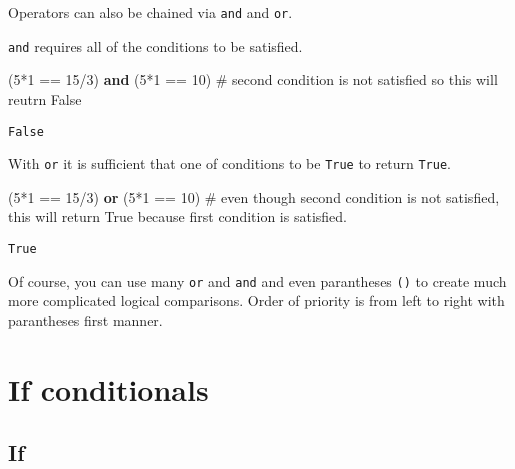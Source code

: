 \documentclass[
  letterpaper,
  DIV=11,
  numbers=noendperiod]{scrreprt}
\newenvironment{Shaded}{\begin{snugshade}}{\end{snugshade}}
\newcommand{\CommentTok}[1]{\textcolor[rgb]{0.37,0.37,0.37}{#1}}
\newcommand{\DecValTok}[1]{\textcolor[rgb]{0.68,0.00,0.00}{#1}}
\newcommand{\KeywordTok}[1]{\textcolor[rgb]{0.00,0.23,0.31}{\textbf{#1}}}
\newcommand{\NormalTok}[1]{\textcolor[rgb]{0.00,0.23,0.31}{#1}}
\newcommand{\OperatorTok}[1]{\textcolor[rgb]{0.37,0.37,0.37}{#1}}
\begin{document}
Operators can also be chained via \texttt{and} and \texttt{or}.

\texttt{and} requires all of the conditions to be satisfied.

\begin{Shaded}
\begin{Highlighting}[]
\NormalTok{(}\DecValTok{5}\OperatorTok{*}\DecValTok{1} \OperatorTok{==} \DecValTok{15}\OperatorTok{/}\DecValTok{3}\NormalTok{) }\KeywordTok{and}\NormalTok{ (}\DecValTok{5}\OperatorTok{*}\DecValTok{1} \OperatorTok{==} \DecValTok{10}\NormalTok{) }\CommentTok{\# second condition is not satisfied so this will reutrn False}
\end{Highlighting}
\end{Shaded}

\begin{verbatim}
False
\end{verbatim}

With \texttt{or} it is sufficient that one of conditions to be
\texttt{True} to return \texttt{True}.

\begin{Shaded}
\begin{Highlighting}[]
\NormalTok{(}\DecValTok{5}\OperatorTok{*}\DecValTok{1} \OperatorTok{==} \DecValTok{15}\OperatorTok{/}\DecValTok{3}\NormalTok{) }\KeywordTok{or}\NormalTok{ (}\DecValTok{5}\OperatorTok{*}\DecValTok{1} \OperatorTok{==} \DecValTok{10}\NormalTok{) }\CommentTok{\# even though second condition is not satisfied, this will return True because first condition is satisfied.}
\end{Highlighting}
\end{Shaded}

\begin{verbatim}
True
\end{verbatim}

Of course, you can use many \texttt{or} and \texttt{and} and even
parantheses \texttt{()} to create much more complicated logical
comparisons. Order of priority is from left to right with parantheses
first manner.

\chapter{If conditionals}\label{if-conditionals}

\section{If}\label{if}
\end{document}
